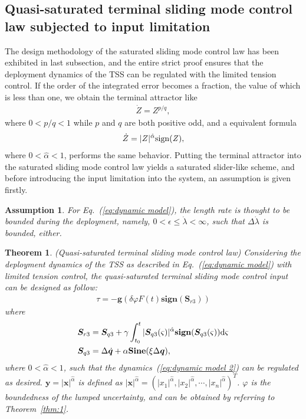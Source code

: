 \documentclass[3p]{elsarticle}
\theoremstyle{plain}
\newtheorem{myas}{Assumption}
\newtheorem{mythm}{Theorem}
\theoremstyle{remark}
\begin{document}
\subsection{Quasi-saturated terminal sliding mode control law subjected to input limitation}
The design methodology of the saturated sliding mode control law has been exhibited in last subsection, and the entire strict proof ensures that the deployment dynamics of the TSS can be regulated with the limited tension control. If the order of the integrated error becomes a fraction, the value of which is less than one, we obtain the terminal attractor like
\begin{align}
\dot Z = Z^{p/q},
\end{align}
where $0<p/q<1$ while $p$ and $q$ are both positive odd, and a equivalent formula
\begin{align}
\dot Z = \vert Z\vert^{\hat\alpha} {\rm{sign}}\it{(Z)},
\end{align}
where $0<\hat \alpha<1$, performs the same behavior. Putting the terminal attractor into the saturated sliding mode control law yields a saturated slider-like scheme, and before introducing the input limitation into the system, an assumption is given firstly.
\begin{myas}\label{as:1}
For Eq.~(\ref{eq:dynamic model}), the length rate is thought to be bounded during the deployment, namely, $0<\epsilon\le\dot \lambda<\infty$, such that $\Delta \dot \lambda$ is bounded, either.
\end{myas}
\begin{mythm}\label{thm:2}(Quasi-saturated terminal sliding mode control law)
Considering the deployment dynamics of the TSS as described in Eq.~(\ref{eq:dynamic model}) with limited tension control, the quasi-saturated terminal sliding mode control input can be designed as follow:
\begin{align}
\tau = -\bm{g}(\delta\varphi F(t) \mathbf{sign}(\bm S_{r3}))
\end{align}
where
\begin{align}
\bm S_{r3} &= \bm S_{q3}+\gamma\int^t_{t_0}\vert \bm S_{q3}(\varsigma)\vert^{\hat\alpha}  \mathbf{sign}(\bm S_{q3}(\varsigma))\rm{d}\it{\varsigma}\label{eq:Sr3}\\
\bm S_{q3} &= \Delta \dot {\bm q}+\alpha \mathbf{Sine}(\xi\Delta \bm q),\label{eq:Sq3}
\end{align}
where $0<\hat\alpha< 1$, such that the dynamics~(\ref{eq:dynamic model 2}) can be regulated as desired. $\bm y=\vert \bm x\vert^{\hat\alpha}$ is defined as $\vert \bm x\vert^{\hat\alpha} =\left(\vert x_1\vert^{\hat\alpha},\vert x_2\vert^{\hat\alpha},\cdots,\vert x_n\vert^{\hat\alpha}\right)^T$. $\varphi$ is the boundedness of the lumped uncertainty, and can be obtained by referring to Theorem~\ref{thm:1}.
\end{mythm}
\end{document}
